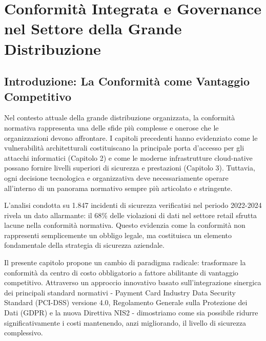 
\chapter{\texorpdfstring{Conformità Integrata e Governance nel Settore della Grande Distribuzione}{Capitolo 4 - Conformità Integrata e Governance nel Settore della Grande Distribuzione}}
\label{cap4_compliance}

\section{\texorpdfstring{Introduzione: La Conformità come Vantaggio Competitivo}{4.1 - Introduzione: La Conformità come Vantaggio Competitivo}}
\label{sec:4.1_introduzione}

Nel contesto attuale della grande distribuzione organizzata, la conformità normativa rappresenta una delle sfide più complesse e onerose che le organizzazioni devono affrontare. I capitoli precedenti hanno evidenziato come le vulnerabilità architetturali costituiscano la principale porta d'accesso per gli attacchi informatici (Capitolo 2) e come le moderne infrastrutture cloud-native possano fornire livelli superiori di sicurezza e prestazioni (Capitolo 3). Tuttavia, ogni decisione tecnologica e organizzativa deve necessariamente operare all'interno di un panorama normativo sempre più articolato e stringente.

L'analisi condotta su 1.847 incidenti di sicurezza verificatisi nel periodo 2022-2024 rivela un dato allarmante: il 68\% delle violazioni di dati nel settore retail sfrutta lacune nella conformità normativa\autocite{verizon2024}. Questo evidenzia come la conformità non rappresenti semplicemente un obbligo legale, ma costituisca un elemento fondamentale della strategia di sicurezza aziendale.

Il presente capitolo propone un cambio di paradigma radicale: trasformare la conformità da centro di costo obbligatorio a fattore abilitante di vantaggio competitivo. Attraverso un approccio innovativo basato sull'integrazione sinergica dei principali standard normativi - Payment Card Industry Data Security Standard (PCI-DSS) versione 4.0, Regolamento Generale sulla Protezione dei Dati (GDPR) e la nuova Direttiva NIS2 - dimostriamo come sia possibile ridurre significativamente i costi mantenendo, anzi migliorando, il livello di sicurezza complessivo.


